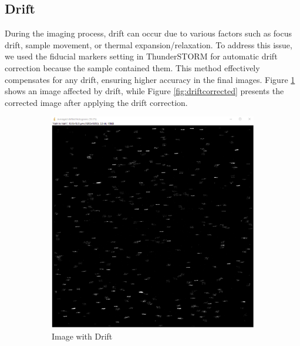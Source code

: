 \documentclass[a4paper,english,12pt,bibliography=totoc]{scrreprt}
\begin{document}
\subsection{Drift}

During the imaging process, drift can occur due to various factors such as focus drift, sample movement, or thermal expansion/relaxation. To address this issue, we used the fiducial markers setting in ThunderSTORM for automatic drift correction because the sample contained them. This method effectively compensates for any drift, ensuring higher accuracy in the final images. Figure \ref{fig:imagewithdrift} shows an image affected by drift, while Figure \ref{fig:driftcorrected} presents the corrected image after applying the drift correction.


\begin{figure}[H]
    \centering
    \begin{subfigure}[b]{0.4\textwidth}
        \centering
        \includegraphics[width=\textwidth]{Images/PAINT/ImageWithDrift.png}
        \caption{Image with Drift}
        \label{fig:imagewithdrift}
    \end{subfigure}
    \hfill
    \begin{subfigure}[b]{0.4\textwidth}
        \centering

\end{subfigure}
\end{figure}
\end{document}
